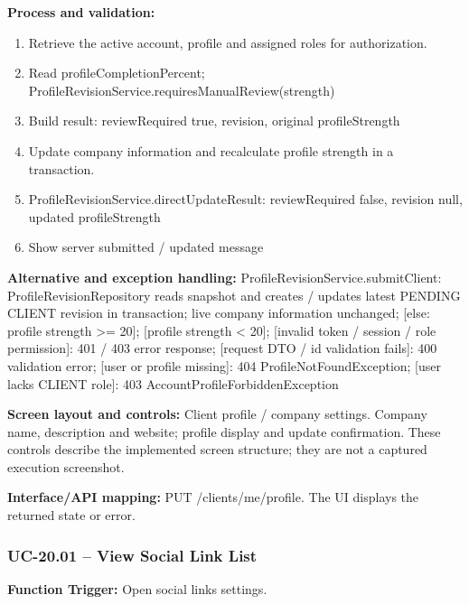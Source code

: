 \textbf{Process and validation:}
\begin{enumerate}
\item Retrieve the active account, profile and assigned roles for authorization.
\item Read profile\allowbreak{}Completion\allowbreak{}Percent; Profile\allowbreak{}Revision\allowbreak{}Service.requires\allowbreak{}Manual\allowbreak{}Review(strength)
\item Build result: review\allowbreak{}Required true, revision, original profile\allowbreak{}Strength
\item Update company information and recalculate profile strength in a transaction.
\item Profile\allowbreak{}Revision\allowbreak{}Service.direct\allowbreak{}Update\allowbreak{}Result: review\allowbreak{}Required false, revision null, updated profile\allowbreak{}Strength
\item Show server submitted /\allowbreak{} updated message
\end{enumerate}
\textbf{Alternative and exception handling:} Profile\allowbreak{}Revision\allowbreak{}Service.submit\allowbreak{}Client: Profile\allowbreak{}Revision\allowbreak{}Repository reads snapshot and creates /\allowbreak{} updates latest PENDING CLIENT revision in transaction; live company information unchanged; [else: profile strength >=\allowbreak{} 20]; [profile strength < 20]; [invalid token /\allowbreak{} session /\allowbreak{} role permission]: 401 /\allowbreak{} 403 error response; [request DTO /\allowbreak{} id validation fails]: 400 validation error; [user or profile missing]: 404 Profile\allowbreak{}Not\allowbreak{}Found\allowbreak{}Exception; [user lacks CLIENT role]: 403 Account\allowbreak{}Profile\allowbreak{}Forbidden\allowbreak{}Exception

\textbf{Screen layout and controls:} Client profile /\allowbreak{} company settings. Company name, description and website; profile display and update confirmation. These controls describe the implemented screen structure; they are not a captured execution screenshot.

\textbf{Interface/\allowbreak{}API mapping:} PUT /\allowbreak{}clients/\allowbreak{}me/\allowbreak{}profile. The UI displays the returned state or error.

\subsubsection{UC-20.01 -- View Social Link List}
\textbf{Function Trigger:} Open social links settings.

